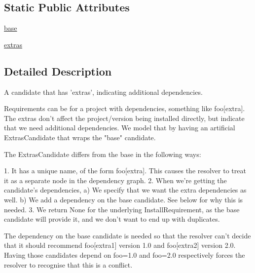 \subsection*{Static Public Attributes}
\begin{DoxyCompactItemize}
\item 
\hyperlink{classpip_1_1__internal_1_1resolution_1_1resolvelib_1_1candidates_1_1ExtrasCandidate_a920a920fda7141419c93f61ab8cb2af0}{base}
\item 
\hyperlink{classpip_1_1__internal_1_1resolution_1_1resolvelib_1_1candidates_1_1ExtrasCandidate_a65769ec830f285b2a706cb5ac2cdd961}{extras}
\end{DoxyCompactItemize}


\subsection{Detailed Description}
\begin{DoxyVerb}A candidate that has 'extras', indicating additional dependencies.

Requirements can be for a project with dependencies, something like
foo[extra].  The extras don't affect the project/version being installed
directly, but indicate that we need additional dependencies. We model that
by having an artificial ExtrasCandidate that wraps the "base" candidate.

The ExtrasCandidate differs from the base in the following ways:

1. It has a unique name, of the form foo[extra]. This causes the resolver
   to treat it as a separate node in the dependency graph.
2. When we're getting the candidate's dependencies,
   a) We specify that we want the extra dependencies as well.
   b) We add a dependency on the base candidate.
      See below for why this is needed.
3. We return None for the underlying InstallRequirement, as the base
   candidate will provide it, and we don't want to end up with duplicates.

The dependency on the base candidate is needed so that the resolver can't
decide that it should recommend foo[extra1] version 1.0 and foo[extra2]
version 2.0. Having those candidates depend on foo=1.0 and foo=2.0
respectively forces the resolver to recognise that this is a conflict.
\end{DoxyVerb}
 

